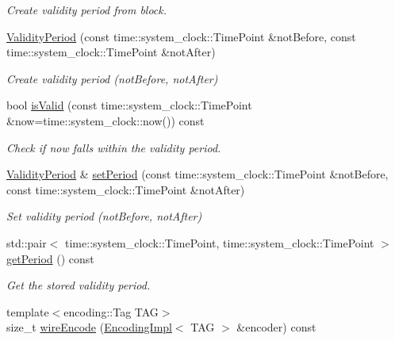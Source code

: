 \begin{DoxyCompactItemize}
\begin{DoxyCompactList}\small\item\em Create validity period from {\ttfamily block}. \end{DoxyCompactList}\item 
\hyperlink{classndn_1_1security_1_1ValidityPeriod_a3d142a6b4db37121218ac0e0e1dd8f7a}{Validity\+Period} (const time\+::system\+\_\+clock\+::\+Time\+Point \&not\+Before, const time\+::system\+\_\+clock\+::\+Time\+Point \&not\+After)
\begin{DoxyCompactList}\small\item\em Create validity period ({\ttfamily not\+Before}, {\ttfamily not\+After}) \end{DoxyCompactList}\item 
bool \hyperlink{classndn_1_1security_1_1ValidityPeriod_a70802488f9d544e4a1726ae7c4c16ea4}{is\+Valid} (const time\+::system\+\_\+clock\+::\+Time\+Point \&now=time\+::system\+\_\+clock\+::now()) const
\begin{DoxyCompactList}\small\item\em Check if {\ttfamily now} falls within the validity period. \end{DoxyCompactList}\item 
\hyperlink{classndn_1_1security_1_1ValidityPeriod}{Validity\+Period} \& \hyperlink{classndn_1_1security_1_1ValidityPeriod_aeaf46f808d82379340773ebf9cdd8e4c}{set\+Period} (const time\+::system\+\_\+clock\+::\+Time\+Point \&not\+Before, const time\+::system\+\_\+clock\+::\+Time\+Point \&not\+After)
\begin{DoxyCompactList}\small\item\em Set validity period ({\ttfamily not\+Before}, {\ttfamily not\+After}) \end{DoxyCompactList}\item 
std\+::pair$<$ time\+::system\+\_\+clock\+::\+Time\+Point, time\+::system\+\_\+clock\+::\+Time\+Point $>$ \hyperlink{classndn_1_1security_1_1ValidityPeriod_aa90fc2056e5ffba124f0f62d59e65ef6}{get\+Period} () const\hypertarget{classndn_1_1security_1_1ValidityPeriod_aa90fc2056e5ffba124f0f62d59e65ef6}{}\label{classndn_1_1security_1_1ValidityPeriod_aa90fc2056e5ffba124f0f62d59e65ef6}

\begin{DoxyCompactList}\small\item\em Get the stored validity period. \end{DoxyCompactList}\item 
{\footnotesize template$<$encoding\+::\+Tag T\+AG$>$ }\\size\+\_\+t \hyperlink{classndn_1_1security_1_1ValidityPeriod_a5f7df62caf6b42a3ddee1398b76c4a35}{wire\+Encode} (\hyperlink{classndn_1_1encoding_1_1EncodingImpl}{Encoding\+Impl}$<$ T\+AG $>$ \&encoder) const\hypertarget{classndn_1_1security_1_1ValidityPeriod_a5f7df62caf6b42a3ddee1398b76c4a35}{}\label{classndn_1_1security_1_1ValidityPeriod_a5f7df62caf6b42a3ddee1398b76c4a35}


\end{DoxyCompactItemize}

